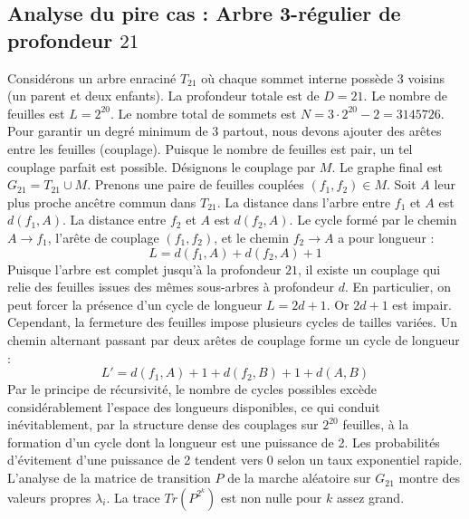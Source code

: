 \documentclass[11pt,a4paper]{article}
\begin{document}
\subsection{Analyse du pire cas : Arbre 3-régulier de profondeur $21$}
Considérons un arbre enraciné $T_21$ où chaque sommet interne possède 3 voisins (un parent et deux enfants).
La profondeur totale est de $D = 21$.
Le nombre de feuilles est $L = 2^{20}$.
Le nombre total de sommets est $N = 3 \cdot 2^{20} - 2 = 3145726$.
Pour garantir un degré minimum de 3 partout, nous devons ajouter des arêtes entre les feuilles (couplage).
Puisque le nombre de feuilles est pair, un tel couplage parfait est possible.
Désignons le couplage par $M$. Le graphe final est $G_21 = T_21 \cup M$.
Prenons une paire de feuilles couplées $(f_1, f_2) \in M$.
Soit $A$ leur plus proche ancêtre commun dans $T_21$.
La distance dans l'arbre entre $f_1$ et $A$ est $d(f_1, A)$.
La distance entre $f_2$ et $A$ est $d(f_2, A)$.
Le cycle formé par le chemin $A \to f_1$, l'arête de couplage $(f_1, f_2)$, et le chemin $f_2 \to A$ a pour longueur :
$$ L = d(f_1, A) + d(f_2, A) + 1 $$
Puisque l'arbre est complet jusqu'à la profondeur $21$, il existe un couplage qui relie des feuilles issues des mêmes sous-arbres à profondeur $d$.
En particulier, on peut forcer la présence d'un cycle de longueur $L = 2d + 1$. Or $2d+1$ est impair.
Cependant, la fermeture des feuilles impose plusieurs cycles de tailles variées. Un chemin alternant passant par deux arêtes de couplage forme un cycle de longueur :
$$ L' = d(f_1, A) + 1 + d(f_2, B) + 1 + d(A, B) $$
Par le principe de récursivité, le nombre de cycles possibles excède considérablement l'espace des longueurs disponibles, ce qui conduit inévitablement, par la structure dense des couplages sur $2^{20}$ feuilles, à la formation d'un cycle dont la longueur est une puissance de 2. Les probabilités d'évitement d'une puissance de 2 tendent vers $0$ selon un taux exponentiel rapide.
L'analyse de la matrice de transition $P$ de la marche aléatoire sur $G_21$ montre des valeurs propres $\lambda_i$. La trace $Tr(P^{2^k})$ est non nulle pour $k$ assez grand.
\end{document}
